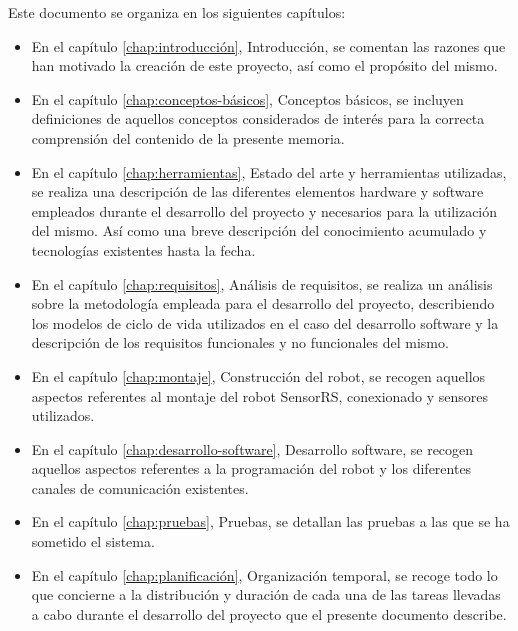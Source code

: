 Este documento se organiza en los siguientes capítulos:\\

\begin{itemize}

\item En el capítulo \ref{chap:introducción}, Introducción, se comentan las razones que han motivado la creación de este proyecto, así como el propósito del mismo.

\item En el capítulo \ref{chap:conceptos-básicos}, Conceptos básicos, se incluyen definiciones de aquellos conceptos considerados de interés para la correcta comprensión del contenido de la presente memoria.

\item En el capítulo \ref{chap:herramientas}, Estado del arte y herramientas utilizadas, se realiza una descripción de las diferentes elementos hardware y software empleados durante el desarrollo del proyecto y necesarios para la utilización del mismo. Así como una breve descripción del conocimiento acumulado y tecnologías existentes hasta la fecha.

\item En el capítulo \ref{chap:requisitos}, Análisis de requisitos, se realiza un análisis sobre la metodología empleada para el desarrollo del proyecto, describiendo
los modelos de ciclo de vida utilizados en el caso del desarrollo software y la descripción de los requisitos funcionales y no funcionales del mismo.

\item En el capítulo \ref{chap:montaje}, Construcción del robot, se recogen aquellos aspectos referentes al montaje del robot SensorRS, conexionado y sensores utilizados. 

\item En el capítulo \ref{chap:desarrollo-software}, Desarrollo software, se recogen aquellos aspectos referentes a la programación del robot y los diferentes canales de comunicación existentes.

\item En el capítulo \ref{chap:pruebas}, Pruebas, se detallan las pruebas a las que se ha sometido el sistema.

\item En el capítulo \ref{chap:planificación}, Organización temporal, se recoge todo lo que concierne a la distribución y duración de cada una de las tareas llevadas a cabo durante el desarrollo del proyecto que el presente documento describe.


\end{itemize}
